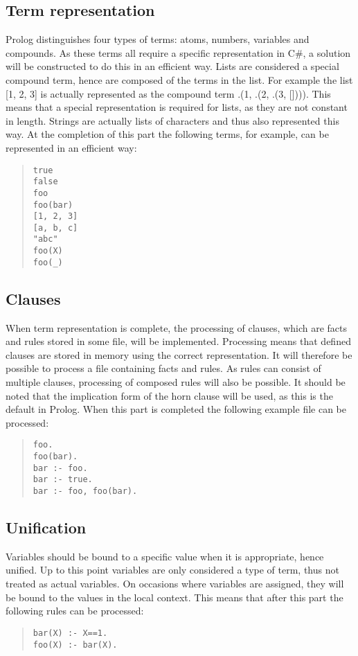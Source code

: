 \documentclass[a4paper]{article}
\begin{document}
\subsection{Term representation}
Prolog distinguishes four types of terms: atoms, numbers, variables and compounds.
As these terms all require a specific representation in C\#, a solution will be constructed to do this in an efficient way.
Lists are considered a special compound term, hence are composed of the terms in the list.
For example the list [1, 2, 3] is actually represented as the compound term .(1, .(2, .(3, []))).
This means that a special representation is required for lists, as they are not constant in 
length.
Strings are actually lists of characters and thus also represented this way.
At the completion of this part the following terms, for example, can be represented in an efficient way:
\begin{quote}\begin{verbatim}
true
false
foo
foo(bar)
[1, 2, 3]
[a, b, c]
"abc"
foo(X)
foo(_)
\end{verbatim}\end{quote}

\subsection{Clauses}
When term representation is complete, the processing of clauses, which are facts and rules stored in some file, will be implemented.
Processing means that defined clauses are stored in memory using the correct representation.
It will therefore be possible to process a file containing facts and rules.
As rules can consist of multiple clauses, processing of composed rules will also be possible.
It should be noted that the implication form of the horn clause will be used, as this is the default in Prolog.
When this part is completed the following example file can be processed:
\begin{quote}\begin{verbatim}
foo.
foo(bar).
bar :- foo.
bar :- true.
bar :- foo, foo(bar).
\end{verbatim}\end{quote}

\subsection{Unification}
Variables should be bound to a specific value when it is appropriate, hence unified.
Up to this point variables are only considered a type of term, thus not treated as actual variables.
On occasions where variables are assigned, they will be bound to the values in the local context.
This means that after this part the following rules can be processed:
\begin{quote}\begin{verbatim}
bar(X) :- X==1.
foo(X) :- bar(X).
\end{verbatim}\end{quote}
\end{document}
